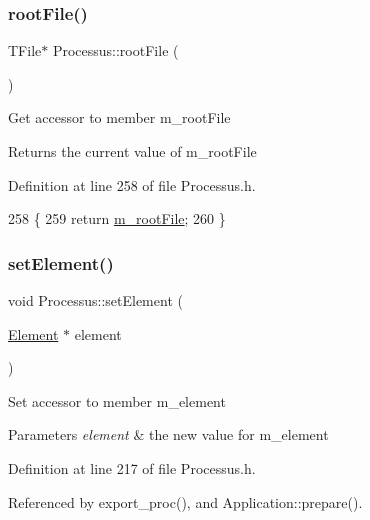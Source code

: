 \subsubsection{\texorpdfstring{root\+File()}{rootFile()}}
{\footnotesize\ttfamily T\+File$\ast$ Processus\+::root\+File (\begin{DoxyParamCaption}{ }\end{DoxyParamCaption})\hspace{0.3cm}{\ttfamily [inline]}}

Get accessor to member m\+\_\+root\+File \begin{DoxyReturn}{Returns}
the current value of m\+\_\+root\+File 
\end{DoxyReturn}


Definition at line 258 of file Processus.\+h.


\begin{DoxyCode}
258                      \{
259     \textcolor{keywordflow}{return} \hyperlink{classProcessus_a76114f8cf2111e910c323a7ae05a015d}{m\_rootFile};
260   \}
\end{DoxyCode}
\mbox{\label{classProcessus_a8ddef94227d83d9dae2cd49aebc33353}} 
\subsubsection{\texorpdfstring{set\+Element()}{setElement()}}
{\footnotesize\ttfamily void Processus\+::set\+Element (\begin{DoxyParamCaption}\item[{\hyperlink{classElement}{Element} $\ast$}]{element }\end{DoxyParamCaption})\hspace{0.3cm}{\ttfamily [inline]}}

Set accessor to member m\+\_\+element 
\begin{DoxyParams}{Parameters}
{\em element} & the new value for m\+\_\+element \\
\hline
\end{DoxyParams}


Definition at line 217 of file Processus.\+h.



Referenced by export\+\_\+proc(), and Application\+::prepare().


